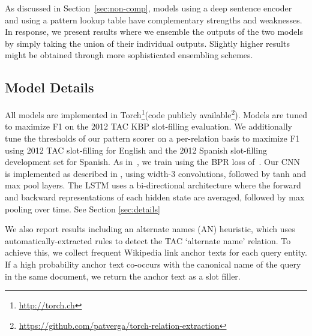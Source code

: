 
As discussed in Section~\ref{sec:non-comp}, models using a deep sentence encoder and using a pattern lookup table have complementary strengths and weaknesses. In response, we present results where we ensemble the outputs of the two models by simply taking the union of their individual outputs. Slightly higher results might be obtained through more sophisticated ensembling schemes. %



\subsection {Model Details \label{sec:models}}
All models are implemented in Torch\footnote{\url{http://torch.ch}}(code publicly available\footnote{\url{https://github.com/patverga/torch-relation-extraction}}).
Models are tuned to maximize F1 on the 2012 TAC KBP slot-filling evaluation.
We additionally tune the thresholds of our pattern scorer on a per-relation basis to maximize F1 using 2012 TAC slot-filling for English and the 2012 Spanish slot-filling development set for Spanish.
As in~\citet{limin}, we train using the BPR loss of~\citet{rendle2009bpr}.
Our CNN is implemented as described in \citet{toutanova2015representing}, using width-3 convolutions, followed by tanh and max pool layers.
The LSTM uses a bi-directional architecture where the forward and backward representations of each hidden state are averaged, followed by max pooling over time.
See Section \ref{sec:details}

We also report results including an alternate names (AN) heuristic, which uses automatically-extracted rules to detect the TAC `alternate name' relation.
To achieve this, we collect frequent Wikipedia link anchor texts for each query entity.
If a high probability anchor text co-occurs with the canonical name of the query in the same document, we return the anchor text as a slot filler.


